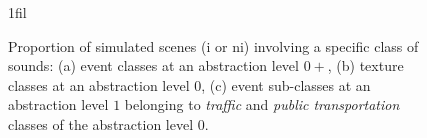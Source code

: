 \documentclass[12pt]{elsarticle}
\makeatletter
\newcommand*{\centerfloat}{%
  \parindent \z@
  \leftskip \z@ \@plus 1fil \@minus \textwidth
  \rightskip\leftskip
  \parfillskip \z@skip}
\makeatother
\begin{document}
\begin{figure}[!tp]
  \centerfloat

                             \caption{Proportion of simulated scenes (i or ni) involving a specific class of sounds: (a) event classes at an abstraction level $0+$, (b) texture classes at an abstraction level $0$, (c) event sub-classes at an abstraction level $1$ belonging to \emph{traffic} and \emph{public transportation} classes of the abstraction level $0$. }\label{fig:soundsource}
\end{figure}

\end{document}
